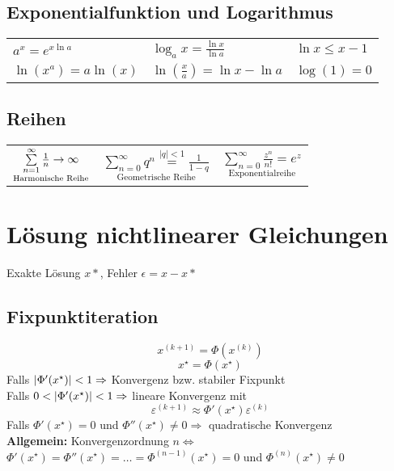 \documentclass[german]{latex4ei/latex4ei_fs}
\begin{document}
\begin{sectionbox}
\subsection{Exponentialfunktion und Logarithmus}
\begin{tabular*}{\columnwidth}{l@{\extracolsep\fill}ll}
	$a^x = e^{x \ln a}$ & $\log_a x = \frac{\ln x}{\ln a}$ & $\ln x \le x -1$\\
	$\ln(x^{a}) = a \ln(x)$ & $\ln(\frac{x}{a}) = \ln x - \ln a$ & $\log(1) = 0$\\
\end{tabular*}

\subsection{Reihen}
\begin{tabularx}{\columnwidth}{CCC}
$\underset{\text{Harmonische Reihe}}{\sum\limits_{n=1}^\infty \frac{1}{n} \rightarrow \infty}$ & $\underset{\text{Geometrische Reihe}}{\sum\limits_{n=0}^\infty q^n \stackrel{|q|<1}= \frac{1}{1-q}}$ & $\underset{\text{Exponentialreihe}}{\sum\limits_{n = 0}^{\infty} \frac{z^n}{n!} = e^z}$
\end{tabularx}
\end{sectionbox}

\section{Lösung nichtlinearer Gleichungen}
Exakte Lösung $x*$, Fehler $\epsilon=x-x*$
\begin{sectionbox}
\subsection{Fixpunktiteration}
\begin{equation*}
	x^{(k + 1)} = \Phi(x^{(k)})
\end{equation*}
\begin{equation*}
	x^\star = \Phi(x^\star)
\end{equation*}
Falls $\left\vert\Phi'(x^\star)\right\vert < 1 \Rightarrow$ Konvergenz bzw. stabiler Fixpunkt \\
Falls $0 < \left\vert\Phi'(x^\star)\right\vert < 1 \Rightarrow$ lineare Konvergenz mit
\begin{equation*}
	\varepsilon^{(k + 1)} \approx \Phi'(x^\star) \varepsilon^{(k)}
\end{equation*}
Falls $\Phi'(x^\star) = 0$ und $\Phi''(x^\star) \ne 0 \Rightarrow$ quadratische Konvergenz \\
\textbf{Allgemein:} Konvergenzordnung $n \Leftrightarrow$\\ $\Phi'(x^\star) = \Phi''(x^\star) = \ldots = \Phi^{(n - 1)}(x^\star) = 0$ und $\Phi^{(n)}(x^\star) \ne 0$
\end{sectionbox}
\end{document}
